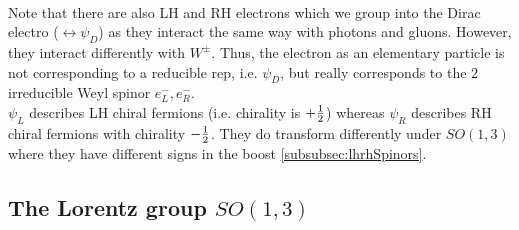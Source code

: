 \begin{enumerate}
\\
Note that there are also LH and RH electrons which we group into the Dirac electro ($\leftrightarrow\psi_D$) as they interact the same way with photons and gluons. However, they interact differently with $W^\pm$. Thus, the electron as an elementary particle is not corresponding to a reducible rep, i.e. $\psi_D$, but really corresponds to the $2$ irreducible Weyl spinor $e^-_L,e^-_R$.\\
$\psi_L$ describes LH chiral fermions (i.e. chirality is $+\frac{1}{2}$) whereas $\psi_R$ describes RH chiral fermions with chirality $-\frac{1}{2}$. They do transform differently under $SO(1,3)$ where they have different signs in the boost \ref{subsubsec:lhrhSpinors}.
\end{enumerate} 



\subsection{The Lorentz group $SO(1,3)$}
